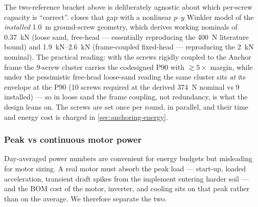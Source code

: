 \documentclass[11pt,a4paper]{article}
\begin{document}
The two-reference bracket above is deliberately agnostic about which per-screw capacity is ``correct''.  closes that gap with a nonlinear $p$--$y$ Winkler model of the \emph{installed} \SI{1.0}{\meter} ground-screw geometry, which derives working nominals of \SI{0.37}{\kilo\newton} (loose sand, free-head --- essentially reproducing the \SI{400}{\newton} literature bound) and \SIrange{1.9}{2.6}{\kilo\newton} (frame-coupled fixed-head --- reproducing the \SI{2}{\kilo\newton} nominal). The practical reading: with the screws rigidly coupled to the Anchor frame the 9-screw cluster carries the codesigned P90 with ${\gtrsim}5\times$ margin, while under the pessimistic free-head loose-sand reading the same cluster sits \emph{at} its envelope at the P90 (10 screws required at the derived \SI{374}{\newton} nominal vs 9 installed) --- so in loose sand the frame coupling, not redundancy, is what the design leans on. The screws are set once per round, in parallel, and their time and energy cost is charged in \cref{sec:anchoring-energy}.

\subsubsection{Peak vs continuous motor power}\label{sec:motor}

Day-averaged power numbers are convenient for energy budgets but misleading for motor sizing. A real motor must absorb the peak load --- start-up, loaded acceleration, transient draft spikes from the implement entering harder soil --- and the BOM cost of the motor, inverter, and cooling sits on that peak rather than on the average. We therefore separate the two.
\end{document}
